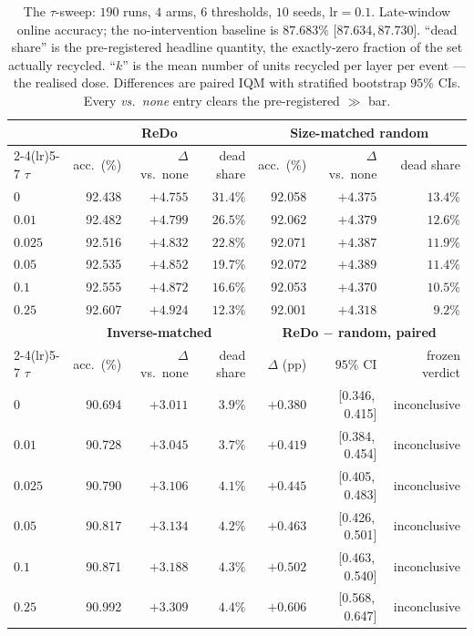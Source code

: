 \documentclass[10pt]{article}
\newcommand{\ci}[2]{{\footnotesize[#1,\,#2]}}
\begin{document}
\begin{table}[t]
\centering
\caption{The $\tau$-sweep: $190$ runs, $4$ arms, $6$ thresholds, $10$ seeds,
$\text{lr}=0.1$. Late-window online accuracy; the no-intervention baseline is
$87.683\%$ \ci{87.634}{87.730}. ``dead share'' is the pre-registered headline
quantity, the exactly-zero fraction of the set actually recycled. ``$k$'' is the
mean number of units recycled per layer per event --- the realised dose.
Differences are paired IQM with stratified bootstrap $95\%$ CIs. Every
\emph{vs.\ none} entry clears the pre-registered $\gg$ bar.}
\label{tab:tau}
\small
\setlength{\tabcolsep}{4.5pt}
\begin{tabular}{@{}l r r r r r r@{}}
\toprule
& \multicolumn{3}{c}{\textbf{ReDo}} & \multicolumn{3}{c}{\textbf{Size-matched random}} \\
\cmidrule(lr){2-4}\cmidrule(lr){5-7}
$\tau$ & acc.\ (\%) & $\Delta$ vs.\ none & dead share & acc.\ (\%) & $\Delta$ vs.\ none & dead share \\
\midrule
$0$      & 92.438 & $+4.755$ & $31.4\%$ & 92.058 & $+4.375$ & $13.4\%$ \\
$0.01$   & 92.482 & $+4.799$ & $26.5\%$ & 92.062 & $+4.379$ & $12.6\%$ \\
$0.025$  & 92.516 & $+4.832$ & $22.8\%$ & 92.071 & $+4.387$ & $11.9\%$ \\
$0.05$   & 92.535 & $+4.852$ & $19.7\%$ & 92.072 & $+4.389$ & $11.4\%$ \\
$0.1$    & 92.555 & $+4.872$ & $16.6\%$ & 92.053 & $+4.370$ & $10.5\%$ \\
$0.25$   & 92.607 & $+4.924$ & $12.3\%$ & 92.001 & $+4.318$ & $9.2\%$ \\
\midrule
& \multicolumn{3}{c}{\textbf{Inverse-matched}} & \multicolumn{3}{c}{\textbf{ReDo $-$ random, paired}} \\
\cmidrule(lr){2-4}\cmidrule(lr){5-7}
$\tau$ & acc.\ (\%) & $\Delta$ vs.\ none & dead share & $\Delta$ (pp) & $95\%$ CI & frozen verdict \\
\midrule
$0$      & 90.694 & $+3.011$ & $3.9\%$ & $+0.380$ & \ci{0.346}{0.415} & inconclusive \\
$0.01$   & 90.728 & $+3.045$ & $3.7\%$ & $+0.419$ & \ci{0.384}{0.454} & inconclusive \\
$0.025$  & 90.790 & $+3.106$ & $4.1\%$ & $+0.445$ & \ci{0.405}{0.483} & inconclusive \\
$0.05$   & 90.817 & $+3.134$ & $4.2\%$ & $+0.463$ & \ci{0.426}{0.501} & inconclusive \\
$0.1$    & 90.871 & $+3.188$ & $4.3\%$ & $+0.502$ & \ci{0.463}{0.540} & inconclusive \\
$0.25$   & 90.992 & $+3.309$ & $4.4\%$ & $+0.606$ & \ci{0.568}{0.647} & inconclusive \\
\bottomrule
\end{tabular}
\end{table}
\end{document}
